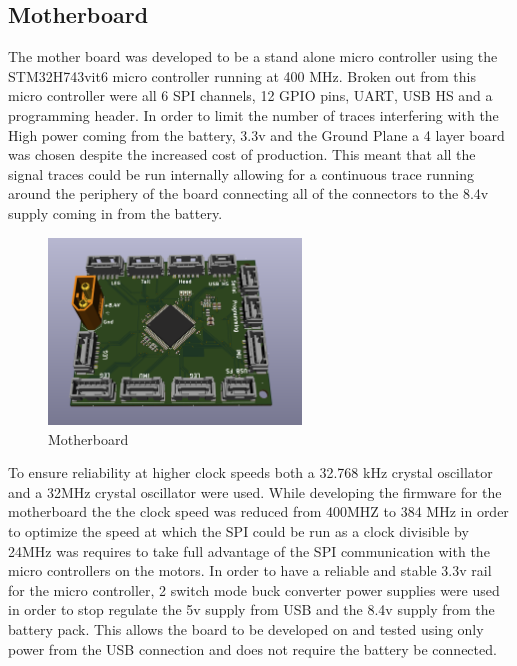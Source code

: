 \subsection{Motherboard}
The mother board was developed to be a stand alone micro controller using the STM32H743vit6 micro controller running at 400 MHz. Broken out from this micro controller were all 6 SPI channels, 12 GPIO pins, UART, USB HS and a programming header. In order to limit the number of traces interfering with the High power  coming from the battery, 3.3v and the Ground Plane a 4 layer board was chosen despite the increased cost of production. This meant that all the signal traces could be run internally allowing for a continuous trace running around the periphery of the board connecting all of the connectors to the 8.4v supply coming in from the battery.
\begin{figure}[H]
       \centering
       \includegraphics[width=0.6\textwidth]{figures/Motherboard_Rev2.png}
       \caption{Motherboard}
       \label{fig:MotherboardPCB}
   \end{figure}
To ensure reliability at higher clock speeds both a 32.768 kHz crystal oscillator and a 32MHz crystal oscillator were used. While developing the firmware for the motherboard the the clock speed was reduced from 400MHZ to 384 MHz in order to optimize the speed at which the SPI could be run as a clock divisible by 24MHz was requires to take full advantage of the SPI communication with the micro controllers on the motors. In order to have a reliable and stable 3.3v rail for the micro controller, 2 switch mode buck converter power supplies were used in order to stop regulate the 5v supply from USB and the 8.4v supply from the battery pack. This allows the board to be developed on and tested using only power from the USB connection and does not require the battery be connected. 
  
